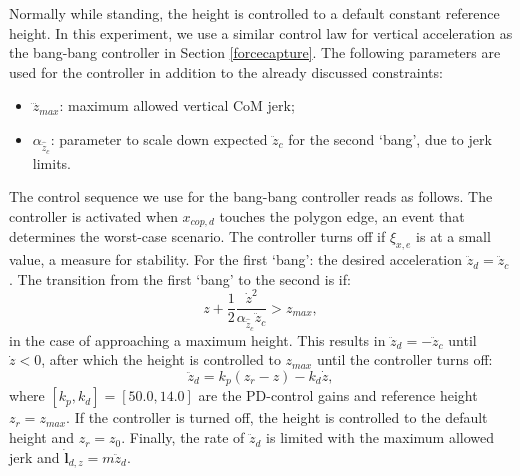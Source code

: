 \documentclass[letterpaper, 10 pt, conference]{ieeeconf}  %
\newcommand{\zmax}{z_{max}}
\newcommand{\rcmpd}{x_{cop,d}}
\newcommand{\icpe}{\xi_{x,e}}
\begin{document}
Normally while standing, the height is controlled to a default constant reference height. In this experiment, we use a similar control law for vertical acceleration as the bang-bang controller in Section \ref{forcecapture}. The following parameters are used for the controller in addition to the already discussed constraints:
\begin{itemize}
	\item $\dddot{z}_{max}$: maximum allowed vertical CoM jerk;
	\item $\alpha_{\hat{\ddot{z}}_{c}}$: parameter to scale down expected $\ddot{z}_c$ for the second `bang', due to jerk limits.
\end{itemize}

The control sequence we use for the bang-bang controller reads as follows. The controller is activated when $\rcmpd$ touches the polygon edge, an event that determines the worst-case scenario. The controller turns off if $\icpe$ is at a small value, a measure for stability. For the first `bang': the desired acceleration $\ddot{z}_d=\ddot{z}_c$. The transition from the first `bang' to the second is if:
\begin{equation}
	z+\frac{1}{2}\frac{\dot{z}^2}{\alpha_{\hat{\ddot{z}}_{c}}\ddot{z}_{c}} >\zmax,
\end{equation}
in the case of approaching a maximum height. This results in $\ddot{z}_d=-\ddot{z}_c$ until $\dot{z}<0$, after which the height is controlled to $\zmax$ until the controller turns off:
\begin{equation}
	\ddot{z}_d = k_p(z_r-z)-k_d\dot{z},
\end{equation}
where $[k_p,k_d]=[50.0,14.0]$ are the PD-control gains and reference height $z_r= \zmax$. If the controller is turned off, the height is controlled to the default height and $z_r=z_0$. Finally, the rate of $\ddot{z}_d$ is limited with the maximum allowed jerk and $\dot{\mathbf{l}}_{d,z}=m\ddot{z}_d$.
\end{document}
